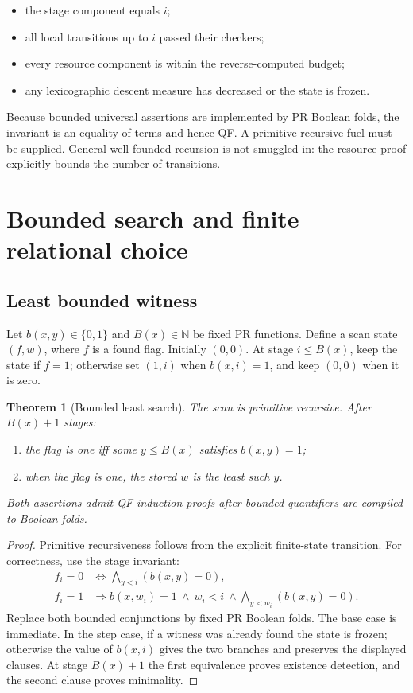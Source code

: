 \documentclass[11pt]{article}
\newtheorem{theorem}{Theorem}[section]
\newcommand{\N}{\mathbb N}
\newcommand{\B}{\{0,1\}}
\begin{document}
\begin{itemize}
\item the stage component equals \(i\);
\item all local transitions up to \(i\) passed their checkers;
\item every resource component is within the reverse-computed budget;
\item any lexicographic descent measure has decreased or the state is frozen.
\end{itemize}

Because bounded universal assertions are implemented by PR Boolean folds, the
invariant is an equality of terms and hence QF.  A primitive-recursive fuel
must be supplied.  General well-founded recursion is not smuggled in: the
resource proof explicitly bounds the number of transitions.

\section{Bounded search and finite relational choice}
\label{sec:choice}

\subsection{Least bounded witness}

Let \(b(x,y)\in\B\) and \(B(x)\in\N\) be fixed PR functions.  Define a scan
state \((f,w)\), where \(f\) is a found flag.  Initially \((0,0)\).  At stage
\(i\le B(x)\), keep the state if \(f=1\); otherwise set \((1,i)\) when
\(b(x,i)=1\), and keep \((0,0)\) when it is zero.

\begin{theorem}[Bounded least search]
\label{thm:bounded-search}
The scan is primitive recursive.  After \(B(x)+1\) stages:
\begin{enumerate}
\item the flag is one iff some \(y\le B(x)\) satisfies \(b(x,y)=1\);
\item when the flag is one, the stored \(w\) is the least such \(y\).
\end{enumerate}
Both assertions admit QF-induction proofs after bounded quantifiers are
compiled to Boolean folds.
\end{theorem}

\begin{proof}
Primitive recursiveness follows from the explicit finite-state transition.
For correctness, use the stage invariant:
\[
\begin{split}
 f_i=0 &\Longleftrightarrow \bigwedge_{y<i}(b(x,y)=0),\\
 f_i=1 &\Longrightarrow b(x,w_i)=1\ \wedge\ w_i<i\ \wedge
       \bigwedge_{y<w_i}(b(x,y)=0).
\end{split}
\]
Replace both bounded conjunctions by fixed PR Boolean folds.  The base case is
immediate.  In the step case, if a witness was already found the state is
frozen; otherwise the value of \(b(x,i)\) gives the two branches and preserves
the displayed clauses.  At stage \(B(x)+1\) the first equivalence proves
existence detection, and the second clause proves minimality.
\end{proof}
\end{document}
